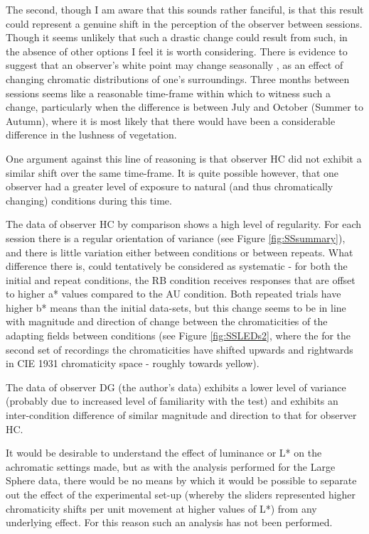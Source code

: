The second, though I am aware that this sounds rather fanciful, is that this result could represent a genuine shift in the perception of the observer between sessions. Though it seems unlikely that such a drastic change could result from such, in the absence of other options I feel it is worth considering. There is evidence to suggest that an observer's white point may change seasonally \cite{welbourne_human_2015}, as an effect of changing chromatic distributions of one's surroundings. Three months between sessions seems like a reasonable time-frame within which to witness such a change, particularly when the difference is between July and October (Summer to Autumn), where it is most likely that there would have been a considerable difference in the lushness of vegetation.

One argument against this line of reasoning is that observer HC did not exhibit a similar shift over the same time-frame. It is quite possible however, that one observer had a greater level of exposure to natural (and thus chromatically changing) conditions during this time.

The data of observer HC by comparison shows a high level of regularity. For each session there is a regular orientation of variance (see Figure \ref{fig:SSsummary}), and there is little variation either between conditions or between repeats. What difference there is, could tentatively be considered as systematic - for both the initial and repeat conditions, the RB condition receives responses that are offset to higher a* values compared to the AU condition. Both repeated trials have higher b* means than the initial data-sets, but this change seems to be in line with magnitude and direction of change between the chromaticities of the adapting fields between conditions (see Figure \ref{fig:SSLEDs2}, where the for the second set of recordings the chromaticities have shifted upwards and rightwards in \gls{CIE} 1931 chromaticity space - roughly towards yellow).

The data of observer DG (the author's data) exhibits a lower level of variance (probably due to increased level of familiarity with the test) and exhibits an inter-condition difference of similar magnitude and direction to that for observer HC.

It would be desirable to understand the effect of luminance or L* on the achromatic settings made, but as with the analysis performed for the Large Sphere data, there would be no means by which it would be possible to separate out the effect of the experimental set-up (whereby the sliders represented higher chromaticity shifts per unit movement at higher values of L*) from any underlying effect. For this reason such an analysis has not been performed.

